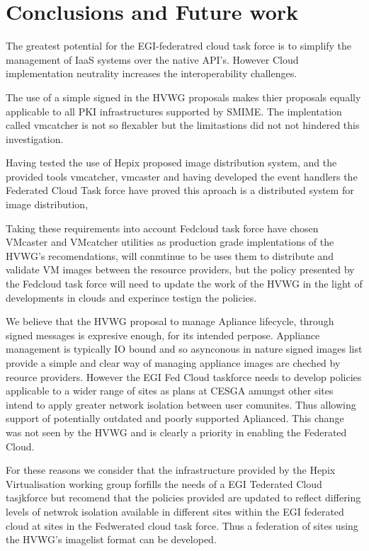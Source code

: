 \documentclass{llncs_Ibergrid2013}
\begin{document}
\section{Conclusions and Future work}
\label{sect-conclusions}
The greatest potential for the EGI-federatred cloud task force is to simplify the management of IaaS systems over the native API's. However Cloud implementation neutrality increases the interoperability challenges. 

The use of a simple signed in the HVWG proposals makes thier proposals equally applicable to all PKI infrastructures supported by SMIME. The implentation called vmcatcher is not so flexabler but the limitastions did not not hindered this investigation.

Having tested the use of Hepix proposed image distribution system, and the provided tools vmcatcher, vmcaster and having developed the event handlers the Federated Cloud Task force have proved this aproach is a distributed system for image distribution, 

Taking these requirements into account Fedcloud task force have chosen VMcaster and VMcatcher utilities as production grade implentations of the HVWG's recomendations, will conmtinue to be uses them to distribute and validate VM images between the resource providers, but the policy presented by the Fedcloud task force will need to update the work of the HVWG in the light of developments in clouds and experince testign the policies.

We believe that the HVWG proposal to manage Apliance lifecycle, through signed messages is expresive enough, for its intended perpose. Appliance management is typically IO bound and so asynconous in nature signed images list provide a simple and clear way of managing appliance images are cheched by reource providers. However the EGI Fed Cloud taskforce needs to develop policies applicable to a wider range of sites as plans at CESGA amungst other sites intend to apply greater network isolation between user comunites. Thus allowing support of potentially outdated and poorly supported Aplianced. This change was not seen by the HVWG and is clearly a priority in enabling the Federated Cloud.

For these reasons we consider that the infrastructure provided by the Hepix Virtualisation working group forfills the needs of a EGI Tederated Cloud tasjkforce but recomend that the policies provided are updated to reflect differing levels of netwrok isolation available in different sites within the EGI federated cloud at sites in the Fedwerated cloud task force. Thus a federation of sites using the HVWG's imagelist format can be developed.
\end{document}
